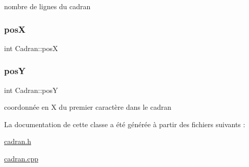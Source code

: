 nombre de lignes du cadran 

\mbox{\label{class_cadran_a4b753893bf4f7bb4b61018544ddb2450}} 
\subsubsection{\texorpdfstring{posX}{posX}}
{\footnotesize\ttfamily int Cadran\+::posX\hspace{0.3cm}{\ttfamily [private]}}

\mbox{\label{class_cadran_a9fe9e082e2421e00d044598765adcdeb}} 
\subsubsection{\texorpdfstring{posY}{posY}}
{\footnotesize\ttfamily int Cadran\+::posY\hspace{0.3cm}{\ttfamily [private]}}



coordonnée en X du premier caractère dans le cadran 



La documentation de cette classe a été générée à partir des fichiers suivants \+:\begin{DoxyCompactItemize}
\item 
\hyperlink{cadran_8h}{cadran.\+h}\item 
\hyperlink{cadran_8cpp}{cadran.\+cpp}\end{DoxyCompactItemize}
